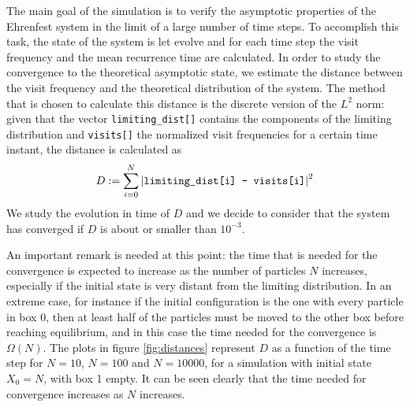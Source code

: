 The main goal of the simulation is to verify the asymptotic properties of the Ehrenfest system in the limit of a large number of time steps. To accomplish this task, the state of the system is let evolve and for each time step the visit frequency and the mean recurrence time are calculated. In order to study the convergence to the theoretical asymptotic state, we estimate the distance between the visit frequency and the theoretical distribution of the system. The method that is chosen to calculate this distance is the discrete version of the $L^2$ norm: given that the vector \texttt{limiting\_dist[]} contains the components of the limiting distribution and \texttt{visits[]} the normalized visit frequencies for a certain time instant, the distance is calculated as
\begin{equation} \label{eq:distance}
    D := \sum_{i = 0}^{N} \left|\text{\texttt{limiting\_dist[i] - visits[i]}} \right| ^2
\end{equation}
We study the evolution in time of $D$ and we decide to consider that the system has converged if $D$ is about or smaller than $10^{-3}$.

An important remark is needed at this point: the time that is needed for the convergence is expected to increase as the number of particles $N$ increases, especially if the initial state is very distant from the limiting distribution. In an extreme case, for instance if the initial configuration is the one with every particle in box 0, then at least half of the particles must be moved to the other box before reaching equilibrium, and in this case the time needed for the convergence is $\Omega(N)$. The plots in figure \ref{fig:distances} represent $D$ as a function of the time step for $N = 10$, $N = 100$ and $N = 10000$, for a simulation with initial state $X_0 = N$, \ie with box 1 empty. It can be seen clearly that the time needed for convergence increases as $N$ increases.

